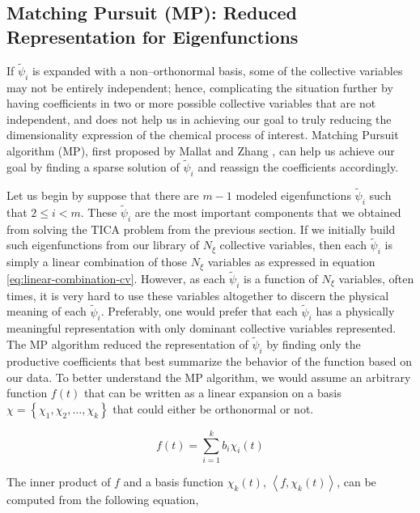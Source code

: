 \begin{spacing}{2.0}
    \subsection{Matching Pursuit (MP): Reduced Representation for Eigenfunctions}

    If $\tilde{\psi}_i$ is expanded with a non--orthonormal basis, some of the collective variables may not be entirely independent; hence, 
    complicating the situation further by having coefficients in two or more possible collective variables that are not independent, and
    does not help us in achieving our goal to truly reducing the dimensionality expression of the chemical process of interest. Matching Pursuit 
    algorithm (MP), first proposed by Mallat and Zhang \cite{P-IEEETrans-1993-v41-Mallat}, can help us achieve our goal by finding a sparse 
    solution of $\tilde{\psi}_i$ and reassign the coefficients accordingly.

    Let us begin by suppose that there are $m-1$ modeled eigenfunctions $\tilde{\psi}_i$ such that $2 \leq i < m$. These $\tilde{\psi}_i$
    are the most important components that we obtained from solving the TICA problem from the previous section. If we initially build such 
    eigenfunctions from our library of $N_{\xi}$ collective variables, then each $\tilde{\psi}_i$ is simply a linear combination of those
    $N_{\xi}$ variables as expressed in equation \ref{eq:linear-combination-cv}. However, as each $\tilde{\psi}_i$ is a function of $N_{\xi}$
    variables, often times, it is very hard to use these variables altogether to discern the physical meaning of each $\tilde{\psi}_i$.
    Preferably, one would prefer that each $\tilde{\psi}_i$ has a physically meaningful representation with only dominant collective variables 
    represented. The MP algorithm reduced the representation of $\tilde{\psi}_i$ by finding only the productive coefficients that best summarize 
    the behavior of the function based on our data. To better understand the MP algorithm, we would assume an arbitrary function $f(t)$ 
    that can be written as a linear expansion on a basis $\chi = \left\{\chi_1,\chi_2,\ldots,\chi_{k}\right\}$ that could either be orthonormal 
    or not.

    \begin{equation}
        f(t) = \sum_{i=1}^k b_i\chi_i(t)
    \end{equation}

    The inner product of $f$ and a basis function $\chi_k(t)$, $\left<f,\chi_k(t)\right>$, can be computed from the following equation,


\end{spacing}
